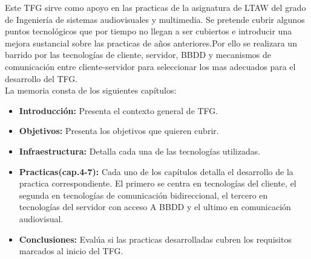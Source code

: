 \documentclass[oneside,a4paper,11pt]{book}
\begin{document}
Este TFG sirve  como apoyo en las practicas de la asignatura de LTAW del grado de Ingeniería de sistemas audiovisuales y multimedia. Se pretende cubrir algunos puntos tecnológicos que por tiempo no llegan a ser cubiertos e introducir una mejora sustancial sobre las practicas de años anteriores.Por ello se realizara un barrido por las tecnologías de cliente, servidor, BBDD y mecanismos de comunicación entre cliente-servidor para seleccionar los mas adecuados para el desarrollo del TFG.
\\La memoria consta de los siguientes capítulos:
\begin{itemize}
\item \textbf{Introducción:} Presenta el contexto general de TFG.
\item\textbf{ Objetivos:} Presenta los objetivos que quieren cubrir.
\item \textbf{Infraestructura:} Detalla cada una de las tecnologías utilizadas.
\item\textbf{Practicas(cap.4-7):} Cada uno de los capítulos detalla el desarrollo de la practica correspondiente. El primero se centra en tecnologías del cliente, el segunda en tecnologías de comunicación bidireccional, el tercero en tecnologías del servidor con acceso A BBDD y el ultimo en comunicación audiovisual.
\item \textbf{Conclusiones:} Evalúa si las practicas desarrolladas cubren los requisitos marcados al inicio del TFG.
\end{itemize}

\tableofcontents %

\listoffigures %


\mainmatter %
\pagestyle{headings}


%




 
 

 
% 
%
\end{document}
